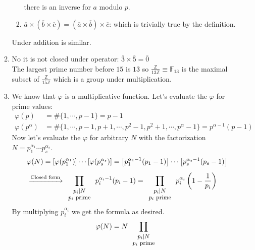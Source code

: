 \documentclass{article}
\begin{document}
\begin{itemize}
\begin{enumerate}[label=(\alph*)]
\begin{enumerate}[label=(\Roman*)]
						there is an inverse for $a$ modulo $p$.
					\item $\overline{a} \times \left(\overline{b} \times \overline{c}\right) = \left(\overline{a} \times \overline{b}\right) \times \overline{c}$: which is trivially true by the definition.\\
				  \end{enumerate}
				  Under addition is similar.
			  \item No it is not closed under operator: $\overline{3} \times \overline{5} = \overline{0}$\\
				  The largest prime number before $15$ is $13$ so $\frac{\mathbb{Z}}{13\mathbb{Z}}\equiv \mathbb{F}_{13}$ 
				  is the maximal subset of 
				$\frac{\mathbb{Z}}{15\mathbb{Z}}$ which is a group under multiplication.
			\item We know that $\varphi$ is a multiplicative function. Let's evaluate the $\varphi$ for prime values:
				\begin{align*}
						\varphi(p) &= \#\{1,\cdots,p-1\} = p-1\\
						\varphi(p^{\alpha}) &= \# \{1,\cdots,p-1,p+1,\cdots,p^2-1,p^2+1,\cdots,p^{\alpha}-1\}=
						p^{\alpha-1}(p-1)
				\end{align*}
				Now let's evaluate the $\varphi$ for arbitrary $N$ with the factorization $N=p_1^{\alpha_{1}}\cdots p_s^{\alpha_{s}}$.
				\begin{align*}
					&\varphi(N) = \left[\varphi(p_1^{\alpha_{1}})\right]\cdots \left[\varphi(p_s^{\alpha_{s}})\right]=
					\left[p_1^{\alpha_{1}-1}(p_1-1)\right]\cdots \left[p_s^{\alpha_{s}-1}(p_s-1)\right]\\[5pt]
					&\xrightarrow{\text{Closed form}} \prod_{\footnotesize\begin{array}{c}p_i|N \\ p_i \text{ prime}\end{array}}
					{p_i^{\alpha_{i}-1}(p_i-1)} =  \prod_{\footnotesize\begin{array}{c}p_i|N \\ p_i \text{ prime}\end{array}}
					{p_i^{\alpha_{i}}\left(1 - \frac{1}{p_i}\right)}
				\end{align*}
				By multiplying $p_i^{\alpha_i}$ we get the formula as desired.
				\begin{align*}
					\varphi(N) = N \prod_{\footnotesize\begin{array}{c}p_i|N \\ p_i \text{ prime}\end{array}}

\end{align*}
\end{enumerate}
\end{itemize}
\end{document}
